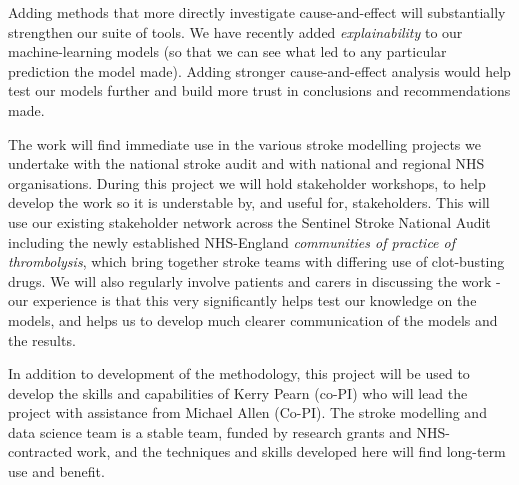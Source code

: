 Adding methods that more directly investigate cause-and-effect will substantially strengthen our suite of tools. We have recently added \textit{explainability} to our machine-learning models (so that we can see what led to any particular prediction the model made). Adding stronger cause-and-effect analysis would help test our models further and build more trust in conclusions and recommendations made. 

The work will find immediate use in the various stroke modelling projects we undertake with the national stroke audit and with national and regional NHS organisations. During this project we will hold stakeholder workshops, to help develop the work so it is understable by, and useful for, stakeholders. This will use our existing stakeholder network across the Sentinel Stroke National Audit including the newly established NHS-England \textit{communities of practice of thrombolysis}, which bring together stroke teams with differing use of clot-busting drugs. We will also regularly involve patients and carers in discussing the work - our experience is that this very significantly helps test our knowledge on the models, and helps us to develop much clearer communication of the models and the results.

In addition to development of the methodology, this project will be used to develop the skills and capabilities of Kerry Pearn (co-PI) who will lead the project with assistance from Michael Allen (Co-PI). The stroke modelling and data science team is a stable team, funded by research grants and NHS-contracted work, and the techniques and skills developed here will find long-term use and benefit.